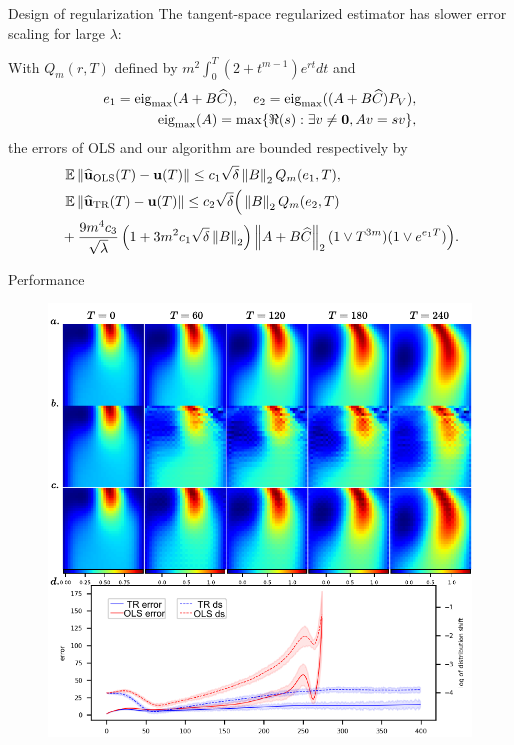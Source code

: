 \documentclass[aspectratio=169]{beamer}
\begin{document}
\begin{frame}{Design of regularization}
	The tangent-space regularized estimator has {\color{red}slower error scaling for large $\lambda$}:
	\begin{Thm}
		With $Q_m(r, T)$ defined by $m^2\int_0^T (2 + t^{m-1})e^{r t}dt$ and
		\begin{equation*}
			\begin{aligned}
				e_1 = \text{eig}_{\max}(A+B\widehat C), \quad e_2 = \text{eig}_{\max}((A+B\widehat C)P_V), \\
				\text{eig}_{\max}(A) = \max\{\Re(s): \exists v \neq \mathbf{0}, Av = sv\},
			\end{aligned}
		\end{equation*}
		the errors of OLS and our algorithm are bounded respectively by
		\begin{equation*}\label{equ:a-posterior-error}
			\begin{aligned}
				& \ \mathbb{E}\left\| \widehat{\mathbf{u}}_{\text{OLS}}(T) - \mathbf{u}(T) \right\| \leq c_1\sqrt{\delta}\left\| B \right\|_2Q_m(e_1, T),      \\
				& \ \mathbb{E}\left\| \widehat{\mathbf{u}}_{\text{TR}}(T) - \mathbf{u}(T) \right\| \leq c_2\sqrt{\delta}\Big(\left\| B \right\|_2 Q_m(e_2, T) \\
			& + \frac{9m^4c_3}{\sqrt{\lambda}}\left( 1 + 3m^2c_1\sqrt{\delta}\left\| B \right\|_2\right)\left\| A+B\widehat C \right\|_2 (1\vee T^{3m})(1\vee e^{e_1T}) \Big).
			\end{aligned}
		\end{equation*}
	\end{Thm}
\end{frame}

\begin{frame}{Performance}
	\begin{figure}[ht]
		\centering
		\centerline{\includegraphics[width=.5\linewidth]{fig/NS-TR.pdf}}
	\end{figure}
\end{frame}
\end{document}
